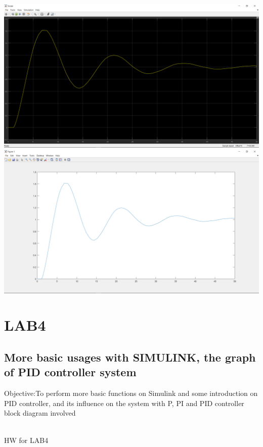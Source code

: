\documentclass[12pt]{article}
\begin{document}
\includegraphics[scale=0.4]{../Lab3,4/HW for lab 3,4/LAB3/Scope.png}\\
\includegraphics[scale=0.4]{../Lab3,4/HW for lab 3,4/LAB3/Plot.png}  


\section{LAB4}
\subsection{More basic usages with SIMULINK, the graph of PID controller system}
Objective:To perform more basic functions on Simulink and some introduction on PID controller, and its influence on the system with P, PI and PID controller block diagram involved\\
\\
\begin{center}
HW for LAB4\\
\end{center}
\end{document}
